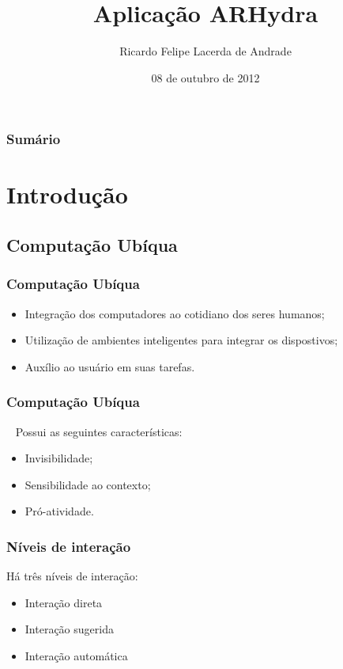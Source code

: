 \documentclass{beamer}
\title{Aplicação ARHydra}
\author{Ricardo Felipe Lacerda de Andrade}
\institute[UnB]
{
    Departamento de Ciência da Computação\\
    Instituto de Ciências Exatas\\
    Universidade de Brasília
}
\date{08 de outubro de 2012}
\begin{document}
\begin{frame}
\titlepage
\end{frame}


\begin{frame}
	\frametitle{Sumário}
	\tableofcontents
\end{frame}



\section{Introdução}


	\subsection{Computação Ubíqua}
		\begin{frame}
	    	\frametitle{Computação Ubíqua}
	    		\begin{itemize}
	    		  \item Integração dos computadores ao cotidiano dos seres humanos;
	    		  \item Utilização de ambientes inteligentes para integrar os dispostivos; 
	    		  \item Auxílio ao usuário em suas tarefas.  
	    		\end{itemize}
		\end{frame}
		
		\begin{frame}  
			\frametitle{Computação Ubíqua} 
		    	Possui as seguintes características:
		    	\begin{itemize}
		    	  \item Invisibilidade;
		    	  \item Sensibilidade ao contexto;
		    	  \item Pró-atividade.
		    	\end{itemize}
		\end{frame}
		
		\begin{frame}
			\frametitle{Níveis de interação}
			
			Há três níveis de interação:
			
			\begin{itemize}
			  \item Interação direta 
			  \item Interação sugerida 
			  \item Interação automática
			\end{itemize}
			
		\end{frame}
		
\end{document}
